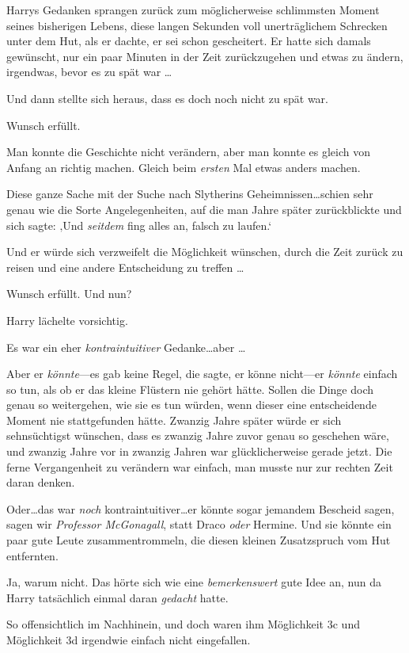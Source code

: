 {Harrys Gedanken sprangen zurück zum möglicherweise schlimmsten Moment seines bisherigen Lebens, diese langen Sekunden voll unerträglichem Schrecken unter dem Hut, als er dachte, er sei schon gescheitert. Er hatte sich damals gewünscht, nur ein paar Minuten in der Zeit zurückzugehen und etwas zu ändern, irgendwas, bevor es zu spät war …

Und dann stellte sich heraus, dass es doch noch nicht zu spät war.

Wunsch erfüllt.

Man konnte die Geschichte nicht verändern, aber man konnte es gleich von Anfang an richtig machen. Gleich beim \emph{ersten} Mal etwas anders machen.

Diese ganze Sache mit der Suche nach Slytherins Geheimnissen…schien sehr genau wie die Sorte Angelegenheiten, auf die man Jahre später zurückblickte und sich sagte: ‚Und \emph{seitdem} fing alles an, falsch zu laufen.`

Und er würde sich verzweifelt die Möglichkeit wünschen, durch die Zeit zurück zu reisen und eine andere Entscheidung zu treffen …

Wunsch erfüllt. Und nun?

Harry lächelte vorsichtig.

Es war ein eher \emph{kontraintuitiver} Gedanke…aber …

Aber er \emph{könnte}—es gab keine Regel, die sagte, er könne nicht—er \emph{könnte} einfach so tun, als ob er das kleine Flüstern nie gehört hätte. Sollen die Dinge doch genau so weitergehen, wie sie es tun würden, wenn dieser eine entscheidende Moment nie stattgefunden hätte. Zwanzig Jahre später würde er sich sehnsüchtigst wünschen, dass es zwanzig Jahre zuvor genau so geschehen wäre, und zwanzig Jahre vor in zwanzig Jahren war glücklicherweise gerade jetzt. Die ferne Vergangenheit zu verändern war einfach, man musste nur zur rechten Zeit daran denken.

Oder…das war \emph{noch} kontraintuitiver…er könnte sogar jemandem Bescheid sagen, sagen wir \emph{Professor McGonagall}, statt Draco \emph{oder} Hermine. Und sie könnte ein paar gute Leute zusammentrommeln, die diesen kleinen Zusatzspruch vom Hut entfernten.

Ja, warum nicht. Das hörte sich wie eine \emph{bemerkenswert} gute Idee an, nun da Harry tatsächlich einmal daran \emph{gedacht} hatte.

So offensichtlich im Nachhinein, und doch waren ihm Möglichkeit 3c und Möglichkeit 3d irgendwie einfach nicht eingefallen.

}
